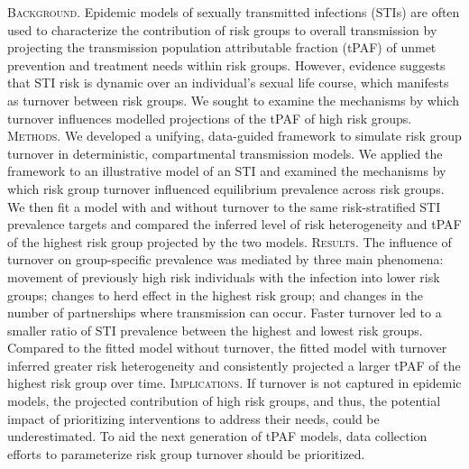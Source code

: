 \textsc{Background.}
Epidemic models of sexually transmitted infections (STIs)
are often used to characterize
the contribution of risk groups
to overall transmission
by projecting the transmission population attributable fraction (tPAF)
of unmet prevention and treatment needs within risk groups.
However, evidence suggests that
STI risk is dynamic over an individual's sexual life course,
which manifests as turnover between risk groups.
We sought to examine the mechanisms by which turnover
influences modelled projections of the tPAF of high risk groups.
\textsc{Methods.}
We developed a unifying, data-guided framework to simulate risk group turnover
in deterministic, compartmental transmission models.
We applied the framework to an illustrative model of an STI
and examined the mechanisms by which
risk group turnover influenced equilibrium prevalence across risk groups.
We then fit a model with and without turnover to
the same risk-stratified STI prevalence targets
and compared the inferred level of risk heterogeneity and
tPAF of the highest risk group projected by the two models.
\textsc{Results.}
The influence of turnover on group-specific prevalence
was mediated by three main phenomena:
movement of previously high risk individuals with the infection into lower risk groups;
changes to herd effect in the highest risk group; and
changes in the number of partnerships where transmission can occur.
Faster turnover led to
a smaller ratio of STI prevalence between the highest and lowest risk groups.
Compared to the fitted model without turnover,
the fitted model with turnover inferred greater risk heterogeneity
and consistently projected a larger tPAF of the highest risk group over time.
\textsc{Implications.}
If turnover is not captured in epidemic models,
the projected contribution of high risk groups, and thus,
the potential impact of prioritizing interventions to address their needs, could be underestimated.
To aid the next generation of tPAF models,
data collection efforts to parameterize risk group turnover should be prioritized.